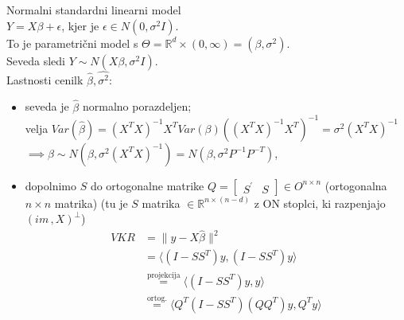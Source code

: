 \documentclass[a4paper, 12pt]{book}
\theoremstyle{definition}
\theoremstyle{remark}
\newcommand{\R}{\mathbb{R}}
\begin{document}
Normalni standardni linearni model \\
$Y = X \beta + \epsilon$, kjer je $\epsilon \in N(0, \sigma^2 I)$. \\
To je parametrični model s $\Theta = \R^d \times (0, \infty) = (\beta, \sigma^2)$. \\
Seveda sledi $Y \sim N(X \beta, \sigma^2 I)$. \\
Lastnosti cenilk $\hat{\beta}, \hat{\sigma^2}$:
\begin{itemize}
  \item seveda je $\hat{\beta}$ normalno porazdeljen; \\
    velja $Var(\hat{\beta}) = (X^TX)^{-1} X^T Var(\beta) \left((X^TX)^{-1} X^T\right)^{-1} = \sigma^2 (X^T X)^{-1}$ \\
    $\implies \beta \sim N\left(\beta, \sigma^2 (X^TX)^{-1}\right) = N(\beta, \sigma^2 P^{-1} P^{-T})$,
  \item dopolnimo $S$ do ortogonalne matrike $Q = \begin{bmatrix}S^{'} & S\end{bmatrix} \in O^{n \times n}$
    (ortogonalna $n \times n$ matrika) (tu je $S$ matrika $\in \R^{n \times (n-d)}$ z ON stoplci,
    ki razpenjajo $(im \,,X)^{\bot}$)
    \begin{align*}
      VKR &= \lVert y - X \hat{\beta} \rVert^2 \\
      &= \langle (I - S S^T) y, (I - S S^T) y\rangle \\
      &\stackrel{\text{projekcija}}{=} \langle (I - S S^T) y, y \rangle \\
      &\stackrel{\text{ortog.}}{=} \langle Q^T (I - S S^T) (Q Q^T) y, Q^T y \rangle
    \end{align*}
\end{itemize}
\end{document}
